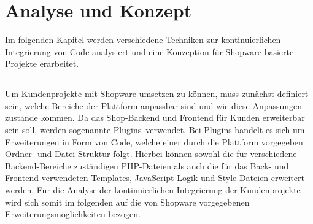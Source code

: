 
\section{Analyse und Konzept} \label{sec:03-concept}

Im folgenden Kapitel werden verschiedene Techniken zur kontinuierlichen Integrierung von Code analysiert und eine
Konzeption für Shopware-basierte Projekte erarbeitet.

\subsection{}

Um Kundenprojekte mit Shopware umsetzen zu können, muss zunächst definiert sein, welche Bereiche der Plattform
anpassbar sind und wie diese Anpassungen zustande kommen.
Da das Shop-Backend und Frontend für Kunden erweiterbar sein soll, werden sogenannte \glqq Plugins\grqq\ verwendet.
Bei Plugins handelt es sich um Erweiterungen in Form von Code, welche einer durch die Plattform vorgegeben Ordner-
und Datei-Struktur folgt.
Hierbei können sowohl die für verschiedene Backend-Bereiche zuständigen PHP-Dateien als auch die für das Back- und
Frontend verwendeten Templates, JavaScript-Logik und Style-Dateien erweitert werden.
Für die Analyse der kontinuierlichen Integrierung der Kundenprojekte wird sich somit im folgenden auf die von Shopware
vorgegebenen Erweiterungsmöglichkeiten bezogen.

\clearpage
